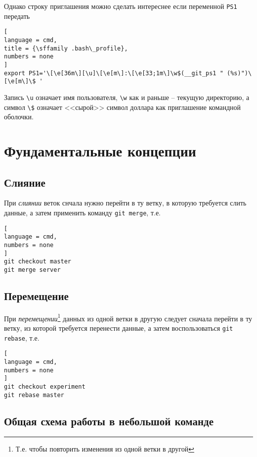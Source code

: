 \documentclass[%
	11pt,
	a4paper,
	utf8,
		]{article}
\begin{document}
Однако строку приглашения можно сделать интереснее если переменной \texttt{PS1} передать
\begin{lstlisting}[
language = cmd,
title = {\sffamily .bash\_profile},
numbers = none
]
export PS1='\[\e[36m\][\u]\[\e[m\]:\[\e[33;1m\]\w$(__git_ps1 " (%s)")\[\e[m\]\$ '
\end{lstlisting}

Запись \verb|\u| означает имя пользователя, \verb|\w| как и раньше -- текущую директорию, а символ \verb|\$| означает <<сырой>> символ доллара как приглашение командной оболочки.


\section{Фундаментальные концепции}

\subsection{Слияние}

При \emph{слиянии} веток снчала нужно перейти в ту ветку, в которую требуется слить данные, а затем применить команду \texttt{git merge}, т.е.

\begin{lstlisting}[
language = cmd,
numbers = none
]
git checkout master
git merge server
\end{lstlisting}

\subsection{Перемещение}

При \emph{перемещении}\footnote{Т.е. чтобы повторить изменения из одной ветки в другой} данных из одной ветки в другую следует сначала перейти в ту ветку, из которой требуется перенести данные, а затем воспользоваться \texttt{git rebase}, т.е.

\begin{lstlisting}[
language = cmd,
numbers = none
]
git checkout experiment
git rebase master
\end{lstlisting}

\subsection{Общая схема работы в небольшой команде}
\end{document}
